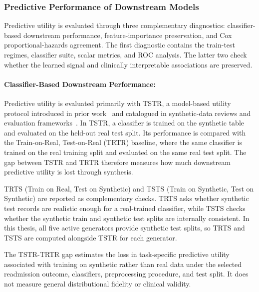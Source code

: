 \subsubsection{Predictive Performance of Downstream Models}
\label{sec:eval:utility:predictive}

Predictive utility is evaluated through three complementary diagnostics:
classifier-based downstream performance, feature-importance preservation,
and Cox proportional-hazards agreement. The first diagnostic contains the
train-test regimes, classifier suite, scalar metrics, and ROC analysis.
The latter two check whether the learned signal and clinically
interpretable associations are preserved.

\paragraph{Classifier-Based Downstream Performance:}
\label{sec:eval:utility:predictive:tstr}
Predictive utility is evaluated primarily with TSTR, 
a model-based utility protocol introduced in prior
work~\cite{Esteban2017TSTR} and catalogued in synthetic-data
reviews and evaluation frameworks~\cite{hernandez2022synthetic,Murtaza2023,lautrup2025syntheval}.
In TSTR, a classifier is trained on the synthetic table and evaluated
on the held-out real test split. Its performance is compared with the
Train-on-Real, Test-on-Real (TRTR) baseline, where the same classifier
is trained on the real training split and evaluated on the same real
test split. The gap between TSTR and TRTR therefore measures how much
downstream predictive utility is lost through synthesis.

TRTS (Train on Real, Test on Synthetic) and TSTS (Train on Synthetic,
Test on Synthetic) are reported as complementary checks. TRTS asks
whether synthetic test records are realistic enough for a real-trained
classifier, while TSTS checks whether the synthetic train and synthetic
test splits are internally consistent. In this thesis, all five active
generators provide synthetic test splits, so TRTS and TSTS are computed
alongside TSTR for each generator.

The TSTR-TRTR gap estimates the loss in task-specific predictive
utility associated with training on synthetic rather than real data
under the selected readmission outcome, classifiers, preprocessing
procedure, and test split. It does not measure general distributional
fidelity or clinical validity.

